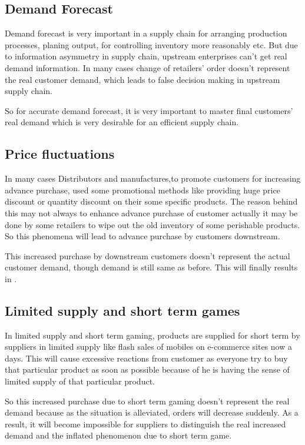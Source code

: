 \documentclass[12pt, a4paper]{report}
\begin{document}
\subsection{Demand Forecast}
\par Demand forecast is very important in a supply chain for arranging production processes, planing output, for controlling inventory more reasonably etc. But due to information asymmetry in supply chain, upstream enterprises can't get real demand information. In many cases change of retailers' order doesn't represent the real customer demand, which leads to false decision making in upstream supply chain.\par
So for accurate demand forecast, it is very important to master final customers' real demand which is very desirable for an efficient supply chain.

\subsection{Price fluctuations}
In many cases Distributors and manufactures,to promote customers for increasing advance purchase, used some promotional methods like providing huge price discount or quantity discount on their some specific products. The reason behind this may not always to enhance advance purchase of customer actually it may be done by some retailers to wipe out the old inventory of some perishable products. So this phenomena will lead to advance purchase by customers downstream.\par
This increased purchase by downstream customers doesn't represent the actual customer demand, though demand is still same as before. This will finally results in .

\subsection{Limited supply and short term games}
In limited supply and short term gaming, products are supplied for short term by suppliers in limited supply like flash sales of mobiles on e-commerce sites now a days. This will cause excessive reactions from customer as everyone try to buy that particular product as soon as possible because of he is having the sense of limited supply of that particular product.\par
So this increased purchase due to short term gaming doesn't represent the real demand because as the situation is alleviated, orders will decrease suddenly. As a result, it will become impossible for suppliers to distinguish the real increased demand and the inflated phenomenon due to short term game.
\end{document}
